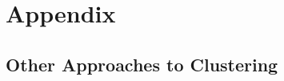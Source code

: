 \appendix
\renewcommand{\thesection}{\Alph{section}}
\chapter*{Appendix}


\section{Other Approaches to Clustering}\label{\positionnumber}
